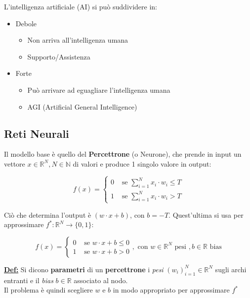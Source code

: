 \documentclass[a4paper,12pt]{article}
\newcommand{\definizione}{\noindent\textbf{\underline{Def:}} }
\begin{document}
	\noindent L'intelligenza artificiale (AI) si può suddividere in:

	\begin{itemize}
		\item Debole
		\begin{itemize}
			\item Non arriva all'intelligenza umana
			\item Supporto/Assistenza
		\end{itemize}
		\item Forte
		\begin{itemize}
			\item Può arrivare ad eguagliare l'intelligenza umana
			\item AGI (Artificial General Intelligence)
		\end{itemize}
	\end{itemize}

	\subsection{Reti Neurali}

	Il modello base è quello del \textbf{Percettrone} (o Neurone), che prende in input un vettore $x \in \mathbb{R}^N, N \in \mathbb{N}$ di valori e produce 1 singolo valore in output:

	\[
	f(x) = \begin{cases}
		0 & \text{ se } \sum_{i=1}^{N} x_i \cdot w_i \leq T \\
		1 & \text{ se } \sum_{i=1}^{N} x_i \cdot w_i  > T
	\end{cases}
	\]

	Ciò che determina l'output è $(w \cdot x + b)$, con $b = -T$. Quest'ultima si usa per approssimare $f^* : \mathbb{R}^N  \rightarrow \{0,1\}$:

	\[
	f(x) = \begin{cases}
		0 & \text{ se } w \cdot x + b \leq 0 \\
		1 & \text{ se } w \cdot x + b > 0
	\end{cases}, \text{ con } w \in \mathbb{R}^N \text{ pesi }, b \in \mathbb{R} \text{ bias}
	\]

	\definizione Si dicono \textbf{parametri} di un \textbf{percettrone} i \textit{pesi} $ (w_i)_{i=1}^N \in \mathbb{R}^N$ sugli archi entranti e il \textit{bias} $b \in \mathbb{R}$ associato al nodo. \\

	\noindent Il problema è quindi scegliere $w$ e $b$ in modo appropriato per approssimare $f^*$ \\
\end{document}
